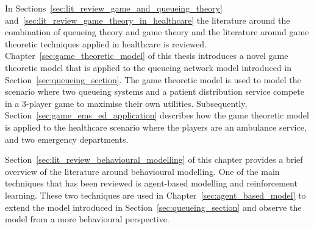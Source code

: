 In Sections~\ref{sec:lit_review_game_and_queueing_theory}
and~\ref{sec:lit_review_game_theory_in_healthcare} the literature around
the combination of queueing theory and game theory and the literature around
game theoretic techniques applied in healthcare is reviewed.
Chapter~\ref{sec:game_theoretic_model} of this thesis introduces a novel
game theoretic model that is applied to the queueing network model introduced
in Section~\ref{sec:queueing_section}.
The game theoretic model is used to model the scenario where two queueing
systems and a patient distribution service compete in a 3-player game to
maximise their own utilities.
Subsequently, Section~\ref{sec:game_ems_ed_application} describes how the
game theoretic model is applied to the healthcare scenario where the players
are an ambulance service, and two emergency departments.

Section~\ref{sec:lit_review_behavioural_modelling} of this chapter
provides a brief overview of the literature around behavioural modelling.
One of the main techniques that has been reviewed is agent-based modelling and
reinforcement learning.
These two techniques are used in Chapter~\ref{sec:agent_based_model} to
extend the model introduced in Section~\ref{sec:queueing_section} and
observe the model from a more behavioural perspective.
